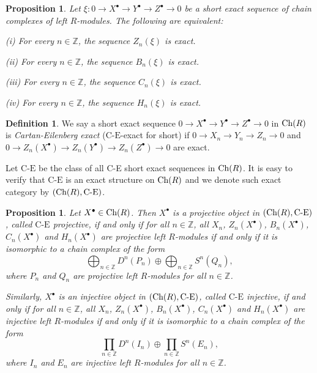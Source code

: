 \documentclass[reqno,12pt]{amsart}
\numberwithin{equation}{section}
\def\Ch{\mbox{\rm Ch}}
\theoremstyle{plain}
\newtheorem{proposition}[theorem]{\bf Proposition}
\theoremstyle{definition}
\newtheorem{definition}[theorem]{\bf Definition}
\newcommand{\CE}{\mathrm{C}\text{-}\mathrm{E}}
\begin{document}
\begin{proposition}\cite[Lemma 5.2]{E11}
    Let $\xi:0\to X^{\bullet}\to Y^{\bullet}\to Z^{\bullet}\to 0$ be a short exact sequence of chain complexes of left $R$-modules. The following are equivalent:

    {\rm (i)} For every $n\in\mathbb{Z}$, the sequence $Z_n(\xi)$ is exact.

    {\rm (ii)} For every $n\in\mathbb{Z}$, the sequence $B_n(\xi)$ is exact.

    {\rm (iii)} For every $n\in\mathbb{Z}$, the sequence $C_n(\xi)$ is exact.

    {\rm (iv)} For every $n\in\mathbb{Z}$, the sequence $H_n(\xi)$ is exact.
\end{proposition}

\begin{definition}
    We say a short exact sequence $0\to X^{\bullet}\to Y^{\bullet} \to Z^{\bullet}\to 0$ in
    $\Ch (R)$ is {\it Cartan-Eilenberg exact} ($\CE$-exact for short) if $0\to X_n\to Y_n
    \to Z_n\to 0$ and $0\to Z_n(X^{\bullet})\to Z_n(Y^{\bullet})\to Z_n(Z^{\bullet})\to 0$ are
    exact.
\end{definition}
Let $\text{C-E}$ be the class of all C-E short exact sequences in $\Ch (R)$. It is easy to
verify that $\text{C-E}$ is an exact structure on $\Ch(R)$ and we denote such exact
category by $(\Ch(R),\text{C-E})$.

\begin{proposition}\cite[Propositions 3.3 and 3.4]{E11}\label{prop-9}
    Let $X^{\bullet}\in\Ch(R)$. Then $X^{\bullet}$ is a projective object in $(\Ch(R),\CE)$,
    called {\it $\CE$ projective}, if and only if for all $n\in\mathbb{Z}$, all $X_n$,
    $Z_n(X^{\bullet})$, $B_n(X^{\bullet})$, $C_n(X^{\bullet})$ and $H_n(X^{\bullet})$ are
    projective left $R$-modules if and only if it is isomorphic to a chain complex of the form
    $$\bigoplus_{n\in\mathbb{Z}} D^n(P_n)\oplus \bigoplus_{n\in\mathbb{Z}}S^n(Q_n),$$
    where $P_n$ and $Q_n$ are projective left $R$-modules for all $n\in\mathbb{Z}$.

    Similarly, $X^{\bullet}$ is an injective object in $(\Ch(R),\CE)$, called {\it $\CE$ injective},
    if and only if for all $n\in\mathbb{Z}$, all $X_n$, $Z_n(X^{\bullet})$, $B_n(X^{\bullet})$,
    $C_n(X^{\bullet})$ and $H_n(X^{\bullet})$ are injective left $R$-modules if and only if it
    is isomorphic to a chain complex of the form $$\prod _{n\in\mathbb{Z}} D^n(I_n)\oplus
    \prod_{n\in\mathbb{Z}}S^n(E_n),$$ where $I_n$ and $E_n$ are injective left $R$-modules for
    all $n\in\mathbb{Z}$.
\end{proposition}
\end{document}
